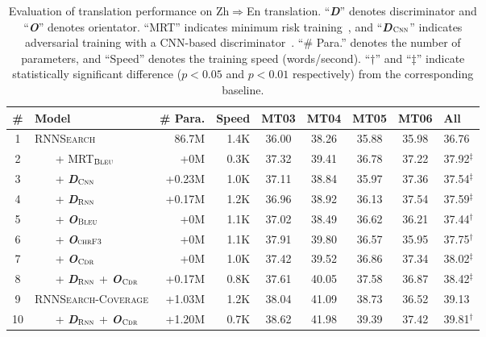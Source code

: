 \documentclass[letterpaper]{article} \usepackage{aaai19}  \usepackage{times}  \usepackage{helvet}  \usepackage{courier}  \usepackage{url}  \usepackage{graphicx}  \frenchspacing  \setlength{\pdfpagewidth}{8.5in}  \setlength{\pdfpageheight}{11in}  \usepackage{amsmath}
\begin{document}
\begin{table*}[t]
  \centering
  
\begin{tabular}{c|l||r r||cccc|l}\bf \#  &   \bf Model &\bf \# Para. & \bf Speed &  \bf  MT03 & \bf MT04 & \bf MT05 & \bf MT06 &  \bf All \\\hline
    1   &   \textsc{RNNSearch} & 86.7M & 1.4K  & 36.00 & 38.26 &35.88 & 35.98 & 36.76   \\ 2 & ~~~ + MRT$_{\textsc{Bleu}}$ & +0M & 0.3K & 37.32 & 39.41 & 36.78 & 37.22 & 37.92$^{\ddag}$  \\
    \hline
    3   &   ~~~ + {\bf \em D}$_{\textsc{Cnn}}$	& +0.23M & 1.0K &  37.11 & 38.84 & 35.97&37.36 &37.54$^{\ddag}$ \\ 4   &   ~~~ + {\bf \em D}$_{\textsc{Rnn}}$	& +0.17M & 1.2K &36.96 & 38.92 & 36.13 & 37.54 & 37.59$^{\ddag}$  \\ \hline
    5   &   ~~~ + {\bf \em O}$_{\textsc{Bleu}}$ & +0M & 1.1K& 37.02&38.49&36.62&36.21& 37.44$^{\dag}$ \\
    6   &   ~~~ + {\bf \em O}$_{\textsc{chrF3}}$ & +0M & 1.1K& 37.91&39.80&36.57&35.95& 37.75$^{\dag}$ \\
    7   &   ~~~ + {\bf \em O}$_{\textsc{Cdr}}$ & +0M & 1.0K	& 37.42&39.52&36.86&37.34& 38.02$^{\ddag}$\\ \hline
8   &   ~~~ + {\bf \em D}$_{\textsc{Rnn}}$ + {\bf \em O}$_{\textsc{Cdr}}$ & +0.17M & 0.8K & 37.61&40.05&37.58&36.87 &  38.42$^{\ddag}$\\\hline \hline
    9   &   \textsc{RNNSearch-Coverage} &  +1.03M   & 1.2K  &   38.04   & 41.09 &   38.73 &   36.52   & 39.13  \\
    10   &   ~~~ + {\bf \em D}$_{\textsc{Rnn}}$ + {\bf \em O}$_{\textsc{Cdr}}$  &  +1.20M   &  0.7K & 38.62   &   41.98   &   39.39   &   37.42   & 39.81$^{\dag}$\\
    
\end{tabular}
  \caption{Evaluation of translation performance on Zh$\Rightarrow$En translation. ``{\bf \em D}'' denotes discriminator and ``{\bf \em O}'' denotes orientator. ``{MRT}'' indicates minimum risk training~\cite{Shen:2016:ACL}, and ``{\bf \em D}$_{\textsc{Cnn}}$'' indicates adversarial training with a CNN-based discriminator~\cite{wu2017adversarial}.
``\# Para.'' denotes the number of parameters, and ``Speed'' denotes the training speed (words/second). ``$\dag$'' and ``$\ddag$'' indicate statistically significant difference ($p < 0.05$ and $p < 0.01$ respectively) from the corresponding baseline.} \label{tab:res} 
\end{table*}
\end{document}
